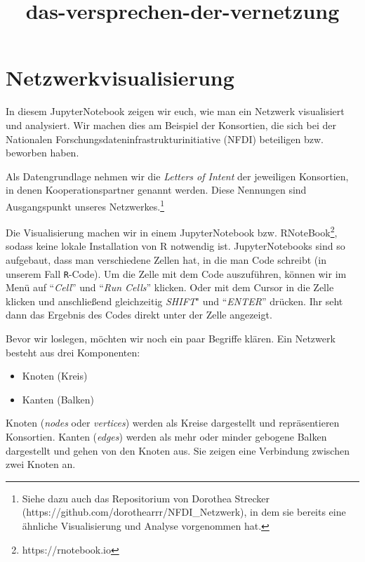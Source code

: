 \documentclass[11pt]{article}
\title{das-versprechen-der-vernetzung}
\providecommand{\tightlist}{%
      \setlength{\itemsep}{0pt}\setlength{\parskip}{0pt}}
\begin{document}
    
    \maketitle
    
    

    
    \hypertarget{netzwerkvisualisierung}{%
\section{Netzwerkvisualisierung}\label{netzwerkvisualisierung}}

In diesem JupyterNotebook zeigen wir euch, wie man ein Netzwerk
visualisiert und analysiert. Wir machen dies am Beispiel der Konsortien,
die sich bei der Nationalen Forschungsdateninfrastrukturinitiative
(NFDI) beteiligen bzw. beworben haben.

Als Datengrundlage nehmen wir die \emph{Letters of Intent} der
jeweiligen Konsortien, in denen Kooperationspartner genannt werden.
Diese Nennungen sind Ausgangspunkt unseres Netzwerkes.\footnote{Siehe
  dazu auch das Repositorium von Dorothea Strecker
  (https://github.com/dorothearrr/NFDI\_Netzwerk), in dem sie bereits
  eine ähnliche Visualisierung und Analyse vorgenommen hat.}

Die Visualisierung machen wir in einem JupyterNotebook bzw.
RNoteBook\footnote{https://rnotebook.io}, sodass keine lokale
Installation von R notwendig ist. JupyterNotebooks sind so aufgebaut,
dass man verschiedene Zellen hat, in die man Code schreibt (in unserem
Fall \texttt{R}-Code). Um die Zelle mit dem Code auszuführen, können wir
im Menü auf ``\emph{Cell}'' und ``\emph{Run Cells}'' klicken. Oder mit
dem Cursor in die Zelle klicken und anschließend gleichzeitig
\emph{SHIFT}" und ``\emph{ENTER}'' drücken. Ihr seht dann das Ergebnis
des Codes direkt unter der Zelle angezeigt.

    Bevor wir loslegen, möchten wir noch ein paar Begriffe klären. Ein
Netzwerk besteht aus drei Komponenten:

\begin{itemize}
\tightlist
\item
  Knoten (Kreis)
\item
  Kanten (Balken)
\end{itemize}

Knoten (\emph{nodes} oder \emph{vertices}) werden als Kreise dargestellt
und repräsentieren Konsortien. Kanten (\emph{edges}) werden als mehr
oder minder gebogene Balken dargestellt und gehen von den Knoten aus.
Sie zeigen eine Verbindung zwischen zwei Knoten an.
\end{document}
